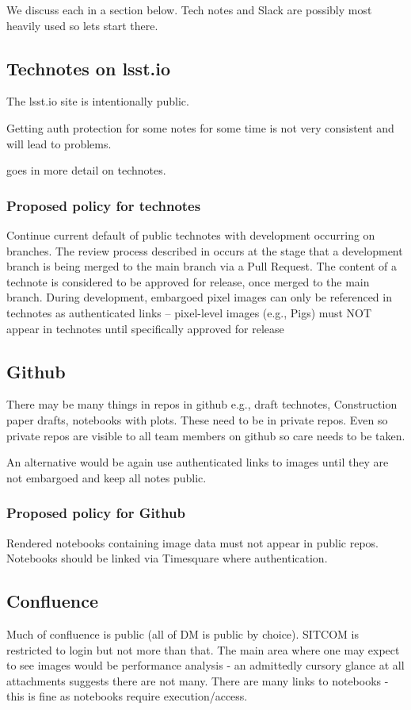 We discuss each in a section below.
Tech notes and Slack are possibly most heavily used so lets start there.



\subsection{Technotes on lsst.io}
The lsst.io site is intentionally public.

Getting auth protection for some notes for some time is not very consistent and will lead to problems.

 goes in more detail on technotes.
\subsubsection{Proposed policy for technotes}
Continue current default of public technotes with development occurring on branches. The review process described in  occurs at the stage that a development branch is being merged to the main branch via a Pull Request. The content of a technote is considered to be approved for release, once merged to the main branch.
During development, embargoed pixel images can only be referenced in technotes as authenticated links – pixel-level images (e.g., Pigs) must NOT appear in technotes until specifically approved for release


\subsection{Github }
There may be many things in repos in github e.g., draft technotes, Construction paper drafts, notebooks with plots.
These need to be in private repos.
Even so private repos are visible to all team members on github so care needs to be taken.

An alternative would be again use authenticated links to images until they are not embargoed and keep all notes public.

\subsubsection{Proposed policy for Github}
Rendered notebooks containing image data must not appear in public repos.
Notebooks should be linked via Timesquare where authentication.

\subsection{Confluence}
Much of confluence is public (all of DM is public by choice).
SITCOM is restricted to login but not more than that.
The main area where one may expect to see images would be performance analysis - an admittedly  cursory glance at all attachments suggests there are not many.
There are many links to notebooks - this is fine as notebooks require execution/access.

